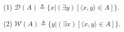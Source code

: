 (1) $\mathcal{D}(A) \triangleq \{x | (\exists y)[\langle x, y \rangle \in A]\}$.

(2) $\mathcal{W}(A) \triangleq \{y | (\exists x)[\langle x, y \rangle \in A]\}$.
